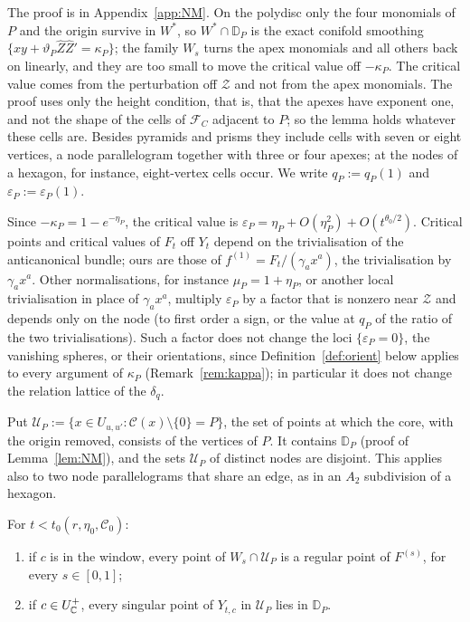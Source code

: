 The proof is in Appendix~\ref{app:NM}. On the polydisc only the four monomials of $P$ and the origin survive in $W^*$,
so $W^*\cap\mathbb D_P$ is the exact conifold smoothing $\{xy+\vartheta_P\hat Z\hat Z'=\kappa_P\}$; the family $W_s$ turns
the apex monomials and all others back on linearly, and they are too small to move the critical value off $-\kappa_P$.
The critical value comes from the perturbation off $\mathcal Z$ and not from the apex monomials. The proof uses only the
height condition, that is, that the apexes have exponent one, and not the shape of the cells of $\mathcal F_C$ adjacent to
$P$; so the lemma holds whatever these cells are. Besides pyramids and prisms they include cells with seven or eight
vertices, a node parallelogram together with three or four apexes; at the nodes of a hexagon, for instance, eight-vertex
cells occur. We write $q_P:=q_P(1)$ and $\varepsilon_P:=\varepsilon_P(1)$.

Since $-\kappa_P=1-e^{-\eta_P}$, the critical value is $\varepsilon_P=\eta_P+O(\eta_P^2)+O(t^{\theta_0/2})$. Critical
points and critical values of $F_t$ off $Y_t$ depend on the trivialisation of the anticanonical bundle; ours are those of
$f^{(1)}=F_t/(\gamma_ax^a)$, the trivialisation by $\gamma_ax^a$. Other normalisations, for instance $\mu_P=1+\eta_P$, or
another local trivialisation in place of $\gamma_ax^a$, multiply $\varepsilon_P$ by a factor that is nonzero near $\mathcal Z$ and depends only on the
node (to first order a sign, or the value at $q_P$ of the ratio of the two trivialisations). Such a factor does not change the loci
$\{\varepsilon_P=0\}$, the vanishing spheres, or their orientations, since Definition~\ref{def:orient} below applies to
every argument of $\kappa_P$ (Remark~\ref{rem:kappa}); in particular it does not change the relation lattice of the
$\delta_q$.

Put $\mathcal U_P:=\{x\in U_{u,u'}:\mathcal C(x)\setminus\{0\}=P\}$, the set of points at which the core, with the origin
removed, consists of the vertices of $P$. It contains $\mathbb D_P$ (proof of Lemma~\ref{lem:NM}), and the sets
$\mathcal U_P$ of distinct nodes are disjoint. This applies also to two node parallelograms that share an edge, as in an
$A_2$ subdivision of a hexagon.

\begin{lemma}\label{lem:TR}
For $t<t_0(r,\eta_0,\mathscr C_0)$:
\begin{enumerate}
\item if $c$ is in the window, every point of $W_s\cap\mathcal U_P$ is a regular point of $F^{(s)}$, for every
$s\in[0,1]$;
\item if $c\in U^+_\mathbb C$, every singular point of $Y_{t,c}$ in $\mathcal U_P$ lies in $\mathbb D_P$.
\end{enumerate}
\end{lemma}


